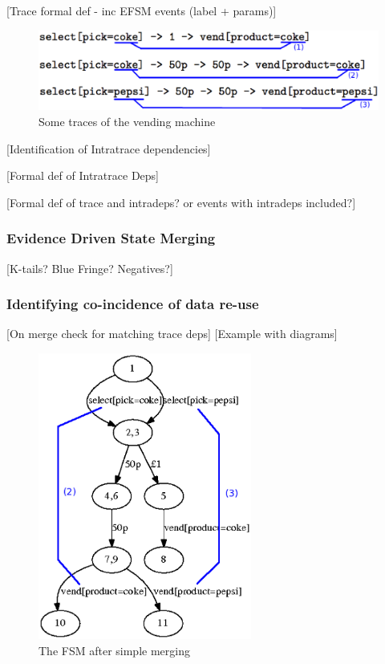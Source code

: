 [Trace formal def - inc EFSM events (label + params)]

\begin{figure}[here]
\begin{center}
\includegraphics[width=12cm]{intratracedeps.eps}
\caption{Some traces of the vending machine}
\label{fig:pta}
\end{center}
\end{figure}

[Identification of Intratrace dependencies]

[Formal def of Intratrace Deps]

[Formal def of trace and intradeps? or events with intradeps included?]

\subsubsection{Evidence Driven State Merging}
\label{EDSM}

[K-tails? Blue Fringe? Negatives?]

\subsubsection{Identifying co-incidence of data re-use}
\label{IntertraceDependencies}



[On merge check for matching trace deps]
[Example with diagrams]

\begin{figure}[here]
\begin{center}
\includegraphics[width=7cm]{vend2-withannotations.eps}
\caption{The FSM after simple merging}
\label{fig:FSM}
\end{center}
\end{figure}


